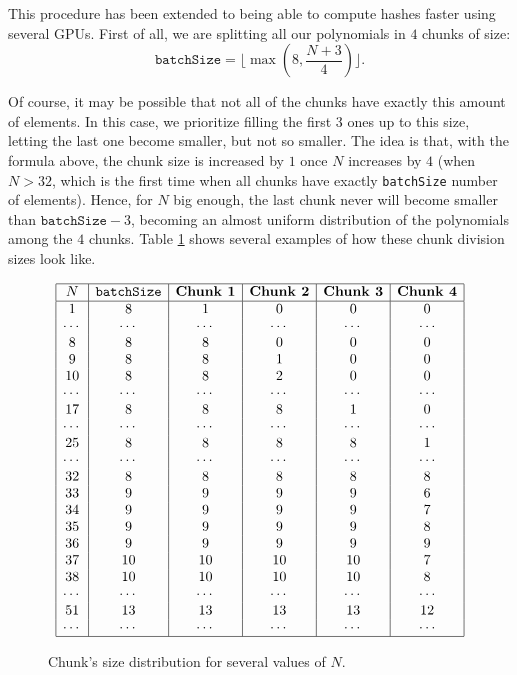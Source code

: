 This procedure has been extended to being able to compute hashes faster using several GPUs. First of all, we are splitting all our polynomials in $4$ chunks of size:
\[
\mathtt{batchSize} = \Biggl\lfloor \max \left( 8, \frac{N + 3}{4} \right)  \Biggr\rfloor.
\]

Of course, it may be possible that not all of the chunks have exactly this amount of elements. In this case, we prioritize filling the first $3$ ones up to this size, letting the last one become smaller, but not so smaller. The idea is that, with the formula above, the chunk size is increased by $1$ once $N$ increases by $4$ (when $N > 32$, which is the first time when all chunks have exactly \texttt{batchSize} number of elements). Hence, for $N$ big enough, the last chunk never will become smaller than $\mathtt{batchSize} - 3$, becoming an almost uniform distribution of the polynomials among the $4$ chunks. Table \ref{tab:multi-gpu-chunks} shows several examples of how these chunk division sizes look like.

\begin{figure}[h!]
	\centering
	\[
	\begin{array}{|c|c|c|c|c|c|}
	\hline
	N	&\texttt{batchSize}	&\textbf{Chunk 1}	&\textbf{Chunk 2}	&\textbf{Chunk 3}	&\textbf{Chunk 4}	\\
	\hline
	1		&8			&1				&0				&0				&0				\\
	\cdots	&\cdots		&\cdots			&\cdots			&\cdots			&\cdots			\\
	8		&8			&8				&0				&0				&0				\\
	9		&8			&8				&1				&0				&0				\\
	10		&8			&8				&2				&0				&0				\\
	\cdots	&\cdots     &\cdots			&\cdots			&\cdots			&\cdots			\\
	17		&8			&8				&8				&1				&0				\\
	\cdots	&\cdots		&\cdots			&\cdots			&\cdots			&\cdots			\\
	25		&8			&8				&8				&8				&1				\\
	\cdots	&\cdots		&\cdots			&\cdots			&\cdots			&\cdots			\\
	32		&8			&8				&8				&8				&8				\\
	33		&9			&9				&9				&9				&6				\\
	34		&9			&9				&9				&9				&7				\\
	35		&9			&9				&9				&9				&8				\\
	36		&9			&9				&9				&9				&9				\\
	37		&10			&10				&10				&10				&7				\\
	38		&10			&10				&10				&10				&8				\\
	\cdots	&\cdots		&\cdots			&\cdots			&\cdots			&\cdots			\\
	51		&13			&13				&13				&13				&12				\\
	\cdots	&\cdots		&\cdots			&\cdots			&\cdots			&\cdots			\\
	\hline
	\end{array}
	\]
	\caption{Chunk's size distribution for several values of $N$.}
	\label{tab:multi-gpu-chunks}
\end{figure}

